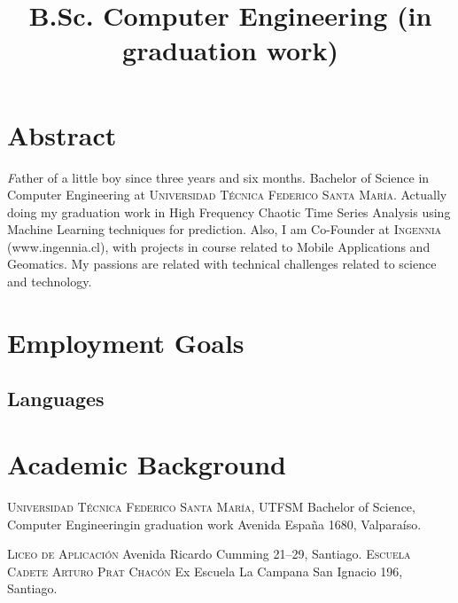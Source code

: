 \documentclass[11pt,letterpaper,roman]{moderncv}
\title{\normalfont \small B.Sc. Computer Engineering (in graduation work) }
\begin{document}
\maketitle

\section*{\textbf{Abstract}} \textsl Father of a little boy since three years
and six months. Bachelor of Science in Computer Engineering at
\textsc{Universidad Técnica Federico Santa María}.  Actually doing my graduation
work in High Frequency Chaotic Time Series Analysis using Machine Learning
techniques for prediction.  Also, I am Co-Founder at \textsc{Ingennia}
(www.ingennia.cl), with projects in course related to Mobile Applications and
Geomatics. My passions are related with technical challenges related to science
and technology.
\section{Employment Goals} 

\subsection{Languages}

\section{Academic Background}
	{\textsc{Universidad T\'ecnica Federico Santa Mar\'ia, UTFSM}}
	{Bachelor of Science, Computer Engineering}{in graduation work}
	{}
	{Avenida España 1680, Valparaíso.}

	{\textsc{Liceo de Aplicaci\'on}}
	{}
	{}
	{}
	{Avenida Ricardo Cumming 21--29, Santiago.}
	{\textsc{Escuela Cadete Arturo Prat Chac\'on}}
	{Ex Escuela La Campana}
	{}
	{}
	{San Ignacio 196, Santiago.}
\end{document}
